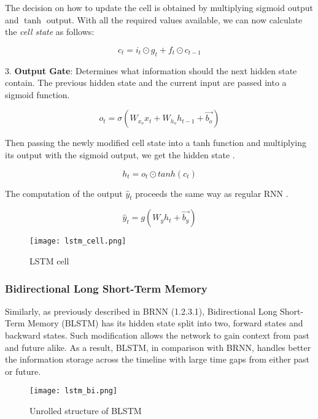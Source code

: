The decision on how to update the cell is obtained by multiplying sigmoid output and $\tanh$ output. With all the required values available, we can now calculate the \textit{cell state} as follows:

\begin{equation}
    {c_t = i_t \odot g_t + f_t \odot c_{t-1}}
\end{equation}


3. \textbf{Output Gate}: Determines what information should the next hidden state contain. The previous hidden state and the current input are passed into a sigmoid function.

\begin{equation}
    {o_t = \sigma(W_{x_o}x_t + W_{h_o}h_{t-1}+\vec{b_o})}
\end{equation}

Then passing the newly modified cell state into a tanh function and multiplying its output with the sigmoid output, we get the hidden state \cite{guideLSTM}.

\begin{equation}
    {h_t = o_t \odot tanh(c_t)}
\end{equation}


The computation of the output $\hat{y}_t$ proceeds the same way as regular RNN \cite{matous}.

\begin{equation}
    {\hat{y}_t = g(W_{y}h_t + \vec{b_y})}
\end{equation}

\begin{figure}[h]
    \centering
    \texttt{[image: lstm\_cell.png]}
    \caption{LSTM cell \cite{lstmcell_img}}
    \label{fig:lstmCell}
\end{figure}

\subsubsection{Bidirectional Long Short-Term Memory}

Similarly, as previously described in BRNN (1.2.3.1), Bidirectional Long Short-Term Memory (BLSTM) has its hidden state split into two, forward states and backward states. Such modification allows the network to gain context from past and future alike. As a result, BLSTM, in comparison with BRNN, handles better the information storage across the timeline with large time gaps from either past or future.

\begin{figure}[h]
    \centering
    \texttt{[image: lstm\_bi.png]}
    \caption{Unrolled structure of BLSTM \cite{matous}}
    \label{fig:blstm}
\end{figure}

